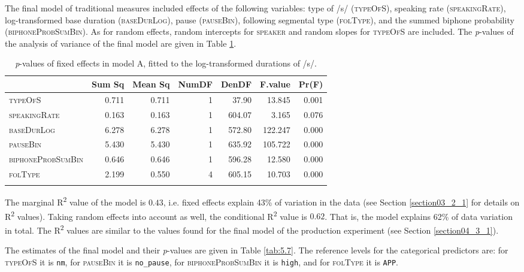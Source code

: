The final model of traditional measures included effects of the following variables: type of /s/ (\textsc{typeOfS}), speaking rate (\textsc{speakingRate}), log-transformed base duration (\textsc{baseDurLog}), pause (\textsc{pauseBin}), following segmental type (\textsc{folType}), and the summed biphone probability (\textsc{biphoneProbSumBin}). As for random effects, random intercepts for \textsc{speaker} and random slopes for \textsc{typeOfS} are included. The \textit{p}-values of the analysis of variance of the final model are given in Table \ref{tab:5.6}.

\begin{table}\fontsize{10}{11}
\caption{\textit{p}-values of fixed effects in model A, fitted to the log-transformed durations of /s/.}
\label{tab:5.6}
\centering
\begin{tabular}{lrrrrrr} 
\lsptoprule
~                 & Sum Sq & Mean Sq & NumDF & DenDF  & F.value & Pr(F)  \\ 
\midrule
\textsc{typeOfS}           & 0.711  & 0.711   & 1     & 37.90  & 13.845  & 0.001  \\
\textsc{speakingRate}      & 0.163  & 0.163   & 1     & 604.07 & 3.165   & 0.076  \\
\textsc{baseDurLog}        & 6.278  & 6.278   & 1     & 572.80 & 122.247 & 0.000  \\
\textsc{pauseBin}          & 5.430  & 5.430   & 1     & 635.92 & 105.722 & 0.000  \\
\textsc{biphoneProbSumBin} & 0.646  & 0.646   & 1     & 596.28 & 12.580  & 0.000  \\
\textsc{folType}           & 2.199  & 0.550   & 4     & 605.15 & 10.703  & 0.000  \\
\lspbottomrule
\end{tabular}
\end{table}

The marginal R\textsuperscript{2} value of the model is $0.43$, i.e. fixed effects explain 43\% of variation in the data (see Section \ref{section03_2_1} for details on R\textsuperscript{2} values). Taking random effects into account as well, the conditional R\textsuperscript{2} value is $0.62$. That is, the model explains 62\% of data variation in total. The R\textsuperscript{2} values are similar to the values found for the final model of the production experiment (see Section \ref{section04_3_1}).

The estimates of the final model and their \textit{p}-values are given in Table \ref{tab:5.7}. The reference levels for the categorical predictors are: for \textsc{typeOfS} it is \texttt{nm}, for \textsc{pauseBin} it is \texttt{no\_pause}, for \textsc{biphoneProbSumBin} it is \texttt{high}, and for \textsc{folType} it is \texttt{APP}.

